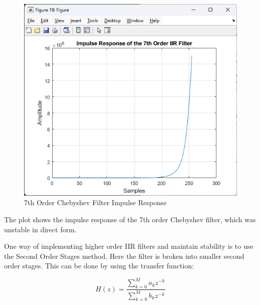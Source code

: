 \documentclass[journal]{IEEEtran}
\begin{document}
\begin{figure}[H]
    \centering
    \includegraphics[width=\linewidth]{7thOrderChebyImpulse.png}
    \caption{7th Order Chebyshev Filter Impulse Response}
    \label{fig:7th_cheby_high_impulse}
\end{figure}

The plot shows the impulse response of the 7th order Chebyshev filter, which was unstable in direct form.

One way of implementing higher order IIR filters and maintain stability is to use the Second Order Stages method. Here the filter is broken into smaller second order stages. This can be done by using the transfer function:

\begin{equation}
    H(z) = \frac{\sum_{k=0}^{M} a_{k} z^{-k}}{\sum_{k=0}^{M} b_{k}z^{-k}}
\end{equation}
\end{document}
